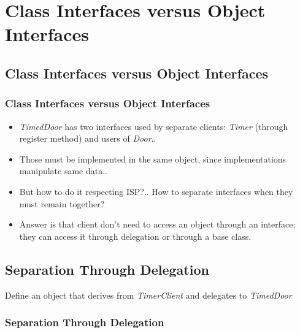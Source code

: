 \documentclass{beamer}
\begin{document}
\section{Class Interfaces versus Object Interfaces}
\subsection{Class Interfaces versus Object Interfaces}
\begin{frame}
  \frametitle{Class Interfaces versus Object Interfaces}
  \begin{itemize}
	\item<+-> \textit{TimedDoor} has two interfaces used by separate clients: \textit{Timer} (through register method) and users of \textit{Door}..
	\item<+-> Those must be implemented in the same object, since implementations manipulate same data..
	\item<+-> But how to do it respecting ISP?.. How to separate interfaces when they must remain together?
	\item<+-> Answer is that client don't need to access an object through an interface; they can access it through delegation or through a base class.
   \end{itemize}
\end{frame}

\subsection{Separation Through Delegation}
\begin{frame}
  Define an object that derives from \textit{TimerClient} and delegates to \textit{TimedDoor} \\
  \frametitle{Separation Through Delegation}
  \begin{center}
	\end{center}
\end{frame}
\end{document}
